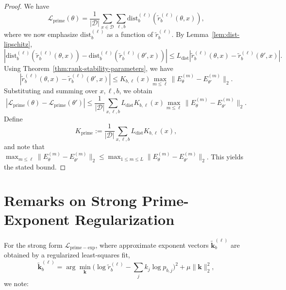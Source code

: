 \documentclass[11pt]{article}
\begin{document}
\begin{proof}
We have
\[
\mathcal{L}_{\mathrm{prime}}(\theta)
= \frac{1}{|\mathcal{D}|}
\sum_{x\in\mathcal{D}}
\sum_{\ell,b}
\mathrm{dist}_b^{(\ell)}(\tilde{r}_b^{(\ell)}(\theta,x)),
\]
where we now emphasize $\mathrm{dist}_b^{(\ell)}$ as a function of $\tilde{r}_b^{(\ell)}$. By Lemma~\ref{lem:dist-lipschitz},
\[
|\mathrm{dist}_b^{(\ell)}(\tilde{r}_b^{(\ell)}(\theta,x)) - \mathrm{dist}_b^{(\ell)}(\tilde{r}_b^{(\ell)}(\theta',x))|
\le L_{\mathrm{dist}} |\tilde{r}_b^{(\ell)}(\theta,x) - \tilde{r}_b^{(\ell)}(\theta',x)|.
\]
Using Theorem~\ref{thm:rank-stability-parameters}, we have
\[
|\tilde{r}_b^{(\ell)}(\theta,x) - \tilde{r}_b^{(\ell)}(\theta',x)|
\le K_{b,\ell}(x) \max_{m\le \ell} \|E^{(m)}_\theta - E^{(m)}_{\theta'}\|_2.
\]
Substituting and summing over $x,\ell,b$, we obtain
\[
|\mathcal{L}_{\mathrm{prime}}(\theta) - \mathcal{L}_{\mathrm{prime}}(\theta')|
\le \frac{1}{|\mathcal{D}|}
\sum_{x,\ell,b}
L_{\mathrm{dist}} K_{b,\ell}(x)
\max_{m\le\ell} \|E^{(m)}_\theta - E^{(m)}_{\theta'}\|_2.
\]
Define
\[
K_{\mathrm{prime}} :=
\frac{1}{|\mathcal{D}|}
\sum_{x,\ell,b}
L_{\mathrm{dist}} K_{b,\ell}(x),
\]
and note that $\max_{m\le\ell}\|E^{(m)}_\theta - E^{(m)}_{\theta'}\|_2 \le \max_{1\le m\le L}\|E^{(m)}_\theta - E^{(m)}_{\theta'}\|_2$. This yields the stated bound.
\end{proof}


\section{Remarks on Strong Prime-Exponent Regularization}

For the strong form $\mathcal{L}_{\mathrm{prime-exp}}$, where approximate exponent vectors $\tilde{\mathbf{k}}_b^{(\ell)}$ are obtained by a regularized least-squares fit,
\[
\tilde{\mathbf{k}}_b^{(\ell)}
= \arg\min_{\mathbf{k}}
\big(\log \tilde{r}_b^{(\ell)} - \sum_j k_j \log p_{b,j}\big)^2
+ \mu \|\mathbf{k}\|_2^2,
\]
we note:
\end{document}
